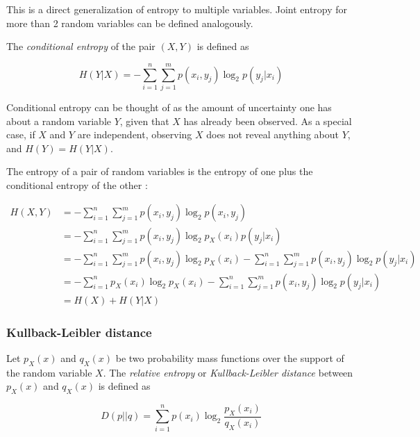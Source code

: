 \documentclass[12pt]{article}
\begin{document}
This is a direct generalization of entropy to multiple variables. Joint entropy for more than 2 random variables can be defined analogously.

The \textit{conditional entropy} \cite{cover-thomas} of the pair $(X,Y)$ is defined as 

\begin{equation}
H(Y|X) = - \sum_{i=1}^n \sum_{j=1}^m p(x_i,y_j) \log_2 p(y_j|x_i)
\end{equation}

Conditional entropy can be thought of as the amount of uncertainty one has about a random variable $Y$, given that $X$ has already been observed. As a special case, if $X$ and $Y$ are independent, observing $X$ does not reveal anything about $Y$, and $H(Y) = H(Y|X)$.

The entropy of a pair of random variables is the entropy of one plus the conditional entropy of the other \cite{cover-thomas}: 

\begin{equation}
\begin{split}
H(X,Y) & = -\sum_{i=1}^n \sum_{j=1}^m p(x_i,y_j) \log_2 p(x_i,y_j) \\
 	   & = -\sum_{i=1}^n \sum_{j=1}^m p(x_i,y_j) \log_2 p_X(x_i)p(y_j|x_i) \\ 
 	   & = -\sum_{i=1}^n \sum_{j=1}^m p(x_i,y_j) \log_2 p_X(x_i) - \sum_{i=1}^n \sum_{j=1}^m p(x_i,y_j) \log_2 p(y_j|x_i) \\
 	   & = -\sum_{i=1}^n p_X(x_i) \log_2 p_X(x_i) - \sum_{i=1}^n \sum_{j=1}^m p(x_i,y_j) \log_2 p(y_j|x_i) \\ 
 	   & = H(X) + H(Y|X)
\label{eq:chain-rule-entropy}
\end{split}
\end{equation}


\subsubsection{Kullback-Leibler distance}

Let $p_X(x)$ and $q_X(x)$ be two probability mass functions over the support of the random variable $X$. The \textit{relative entropy} or \textit{Kullback-Leibler distance} \cite{cover-thomas} between $p_X(x)$ and $q_X(x)$ is defined as

\begin{equation}
D(p||q) = \sum_{i = 1}^n p(x_i) \log_2 \frac{p_X(x_i)}{q_X(x_i)}
\label{eq:kl-distance}
\end{equation} 
\end{document}
